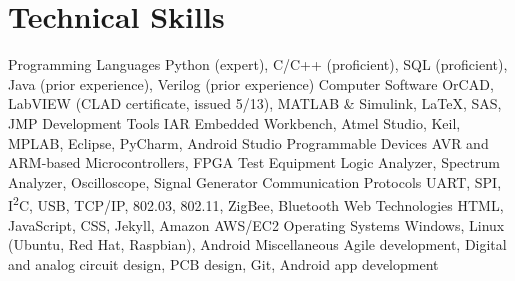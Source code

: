 \section{Technical Skills}
\begin{cvskills}
  \cvskill
    {Programming Languages}
    {Python (expert), C/C++ (proficient), SQL (proficient), Java (prior experience), Verilog (prior experience)}
  \cvskill
    {Computer Software}
    {OrCAD, LabVIEW (CLAD certificate, issued 5/13), MATLAB \& Simulink, LaTeX, SAS, JMP}
  \cvskill
    {Development Tools}
    {IAR Embedded Workbench, Atmel Studio, Keil, MPLAB, Eclipse, PyCharm, Android Studio}
  \cvskill
    {Programmable Devices}
    {AVR and ARM-based Microcontrollers, FPGA}
  \cvskill
    {Test Equipment}
    {Logic Analyzer, Spectrum Analyzer, Oscilloscope, Signal Generator}
  \cvskill
    {Communication Protocols}
    {UART, SPI, I\textsuperscript{2}C, USB, TCP/IP, 802.03, 802.11, ZigBee, Bluetooth}
  \cvskill
    {Web Technologies}
    {HTML, JavaScript, CSS, Jekyll, Amazon AWS/EC2}
  \cvskill
    {Operating Systems}
    {Windows, Linux (Ubuntu, Red Hat, Raspbian), Android}
  \cvskill
    {Miscellaneous}
    {Agile development, Digital and analog circuit design, PCB design, Git, Android app development}
\end{cvskills} 